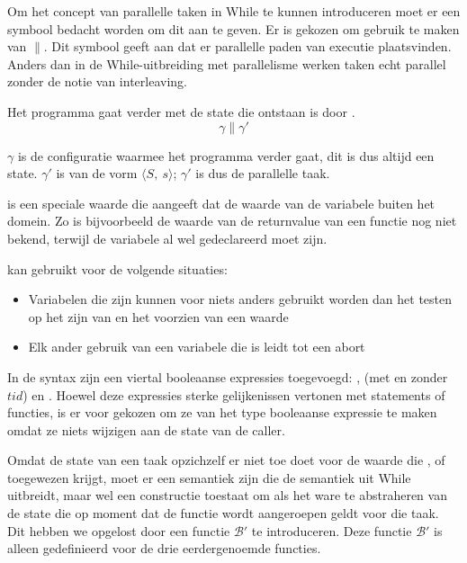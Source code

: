 

Om het concept van parallelle taken in While te kunnen introduceren moet er een symbool bedacht worden om dit aan te
geven. Er is gekozen om gebruik te maken van \(\parallel\). Dit symbool geeft aan dat er parallelle paden van executie
plaatsvinden. Anders dan in de While-uitbreiding met parallelisme werken taken echt parallel zonder de notie van
interleaving.

Het programma gaat verder met de state die ontstaan is door . \[ \gamma \parallel \gamma' \]

\(\gamma\) is de configuratie waarmee het programma verder gaat, dit is dus altijd een state. \(\gamma'\) is van de vorm
\(\langle S,\:s\rangle\); \(\gamma'\) is dus de parallelle taak.

 is een speciale waarde die aangeeft dat de waarde van de variabele buiten het domein. Zo is
bijvoorbeeld de waarde van de returnvalue van een functie nog niet bekend, terwijl de variabele al wel gedeclareerd moet
zijn.

 kan gebruikt voor de volgende situaties:
\begin{itemize}
\item Variabelen die  zijn kunnen voor niets anders gebruikt worden dan het testen op het zijn van  en het
voorzien van een waarde
\item Elk ander gebruik van een variabele die  is leidt tot een abort
\end{itemize}

In de syntax zijn een viertal booleaanse expressies toegevoegd: ,  (met en zonder $tid$) en
. Hoewel deze expressies sterke gelijkenissen vertonen met statements of functies, is er voor gekozen om ze van het type
booleaanse expressie te maken omdat ze niets wijzigen aan de state van de caller.

Omdat de state van een taak opzichzelf er niet toe doet voor de waarde die ,  of
 toegewezen krijgt, moet er een semantiek zijn die de semantiek uit While uitbreidt, maar wel een
constructie toestaat om als het ware te abstraheren van de state die op moment dat de functie wordt aangeroepen geldt
voor die taak. Dit hebben we opgelost door een functie \(\mathcal{B'}\) te introduceren. Deze functie \(\mathcal{B'}\)
is alleen gedefinieerd voor de drie eerdergenoemde functies.

